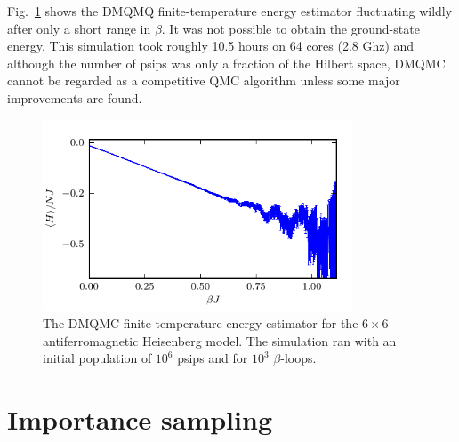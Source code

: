 Fig.~\ref{fig:6x6_no_importance_sampling2_energy} shows the DMQMQ finite-temperature energy estimator fluctuating wildly after only a short range in $\beta$. It was not possible to obtain the ground-state energy. This simulation took roughly 10.5 hours on 64 cores (2.8 Ghz) and although the number of psips was only a fraction of the Hilbert space, DMQMC cannot be regarded as a competitive QMC algorithm unless some major improvements are found.
\begin{figure}[H]
\begin{center}
\includegraphics[width =0.82\textwidth]{6x6_no_importance_sampling2_energy.pdf}
\caption[The DMQMC finite-temperature energy estimator for the $6\times6$ antiferromagnetic Heisenberg model. ]{The DMQMC finite-temperature energy estimator for the $6\times6$ antiferromagnetic Heisenberg model.  The simulation ran with an initial population of $10^6$ psips and for $10^3$ $\beta$-loops.}
\label{fig:6x6_no_importance_sampling2_energy}
\end{center}
\end{figure}

\section{Importance sampling}
\label{sec:importanceSampling}

